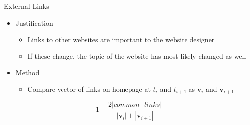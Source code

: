 \documentclass[10pt]{beamer}
\begin{document}
\begin{frame}{External Links}

\Large
\begin{itemize}
\item Justification
\begin{itemize}
\large\item Links to other websites are important to the website designer
\item If these change, the topic of the website has most likely changed as well
\end{itemize}
\item Method
\begin{itemize}
\item Compare vector of links on homepage at $t_i$ and $t_{i+1}$ as $\textbf{v}_i$ and $\textbf{v}_{i+1}$
\end{itemize}
\end{itemize}

\begin{equation*}
1 - \frac{2|common \text{ } links|}{|\textbf{v}_i| + |\textbf{v}_{i+1}|}
\end{equation*}

\end{frame}
\end{document}
